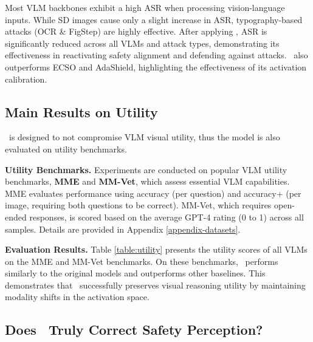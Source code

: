 Most VLM backbones exhibit a high ASR when processing vision-language inputs. While SD images cause only a slight increase in ASR, typography-based attacks (OCR \& FigStep) are highly effective. After applying \OursMethod, ASR is significantly reduced across all VLMs and attack types, demonstrating its effectiveness in reactivating safety alignment and defending against attacks. \OursMethod\ also outperforms ECSO and AdaShield, highlighting the effectiveness of its activation calibration.


\subsection{Main Results on Utility}



\OursMethod\ is designed to not compromise VLM visual utility, thus the model is also evaluated on utility benchmarks.

\textbf{Utility Benchmarks.}
Experiments are conducted on popular VLM utility benchmarks, \textbf{MME} and \textbf{MM-Vet}, which assess essential VLM capabilities. MME evaluates performance using accuracy (per question) and accuracy+ (per image, requiring both questions to be correct). MM-Vet, which requires open-ended responses, is scored based on the average GPT-4 rating (0 to 1) across all samples. Details are provided in Appendix \ref{appendix-datasets}.


\textbf{Evaluation Results.}
Table \ref{table:utility} presents the utility scores of all VLMs on the MME and MM-Vet benchmarks. On these benchmarks, \OursMethod\ performs similarly to the original models and outperforms other baselines. This demonstrates that \OursMethod\ successfully preserves visual reasoning utility by maintaining modality shifts in the activation space.


\subsection{Does \OursMethod\ Truly Correct Safety Perception?}  \label{sec:exp-truely-correct-safety-perception}


